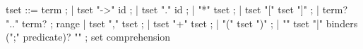 \begin{syntax}
  tset ::= term ;
       | tset "->" id ;
       | tset "." id  ;
       | "*" tset ;
       | tset "[" tset "]" ;
       | term? ".." term? ; range
       | tset "," tset ;
       | tset "+" tset ;  
       | "(" tset ")" ;
       | "{" tset "|" binders (";" predicate)? "}" ; set comprehension
\end{syntax}

